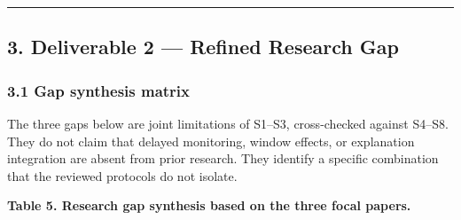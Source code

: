 \documentclass[
]{article}
\begin{document}
\begin{center}\rule{0.5\linewidth}{0.5pt}\end{center}

\hypertarget{deliverable-2-refined-research-gap}{%
\subsection{3. Deliverable 2 --- Refined Research
Gap}\label{deliverable-2-refined-research-gap}}

\hypertarget{gap-synthesis-matrix}{%
\subsubsection{3.1 Gap synthesis matrix}\label{gap-synthesis-matrix}}

The three gaps below are joint limitations of S1--S3, cross-checked
against S4--S8. They do not claim that delayed monitoring, window
effects, or explanation integration are absent from prior research. They
identify a specific combination that the reviewed protocols do not
isolate.

\textbf{Table 5. Research gap synthesis based on the three focal
papers.}
\end{document}
